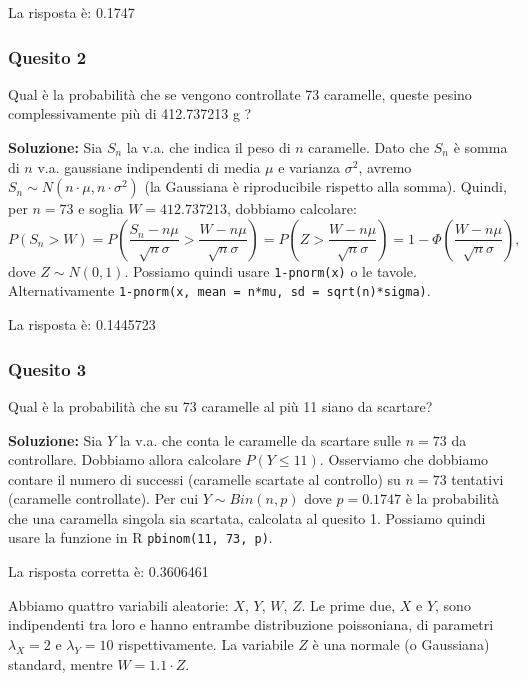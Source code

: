 \documentclass[12pt, a4paper]{article}
\begin{document}
La risposta è: 0.1747

\subsubsection*{Quesito 2}
Qual è la probabilità che se vengono controllate 73 caramelle, queste pesino complessivamente più di 412.737213 g ?

\textbf{Soluzione:}
Sia $S_n$ la v.a. che indica il peso di $n$ caramelle. Dato che $S_n$ è somma di $n$ v.a. gaussiane indipendenti di media $\mu$ e varianza $\sigma^2$, avremo $S_n \sim N(n \cdot \mu, n \cdot \sigma^2)$ (la Gaussiana è riproducibile rispetto alla somma).
Quindi, per $n=73$ e soglia $W=412.737213$, dobbiamo calcolare:
$$ P(S_n > W) = P\left(\frac{S_n - n\mu}{\sqrt{n}\sigma} > \frac{W - n\mu}{\sqrt{n}\sigma}\right) = P\left(Z > \frac{W - n\mu}{\sqrt{n}\sigma}\right) = 1 - \Phi\left(\frac{W - n\mu}{\sqrt{n}\sigma}\right), $$
dove $Z \sim N(0,1)$.
Possiamo quindi usare \texttt{1-pnorm(x)} o le tavole.
Alternativamente \texttt{1-pnorm(x, mean = n*mu, sd = sqrt(n)*sigma)}.

La risposta è: 0.1445723

\subsubsection*{Quesito 3}
Qual è la probabilità che su 73 caramelle al più 11 siano da scartare?

\textbf{Soluzione:}
Sia $Y$ la v.a. che conta le caramelle da scartare sulle $n=73$ da controllare. Dobbiamo allora calcolare $P(Y \leq 11)$.
Osserviamo che dobbiamo contare il numero di successi (caramelle scartate al controllo) su $n=73$ tentativi (caramelle controllate). Per cui $Y \sim Bin(n, p)$ dove $p=0.1747$ è la probabilità che una caramella singola sia scartata, calcolata al quesito 1.
Possiamo quindi usare la funzione in R \texttt{pbinom(11, 73, p)}.

La risposta corretta è: 0.3606461


\vspace{0.5cm}
\begin{tcolorbox}[colback=lightergray!10, colframe=tocsec, title=\textbf{Esercizio 11}]
Abbiamo quattro variabili aleatorie: $X$, $Y$, $W$, $Z$.
Le prime due, $X$ e $Y$, sono indipendenti tra loro e hanno entrambe distribuzione poissoniana, di parametri $\lambda_X=2$ e $\lambda_Y=10$ rispettivamente.
La variabile $Z$ è una normale (o Gaussiana) standard, mentre $W=1.1 \cdot Z$.
\end{tcolorbox}
\end{document}

